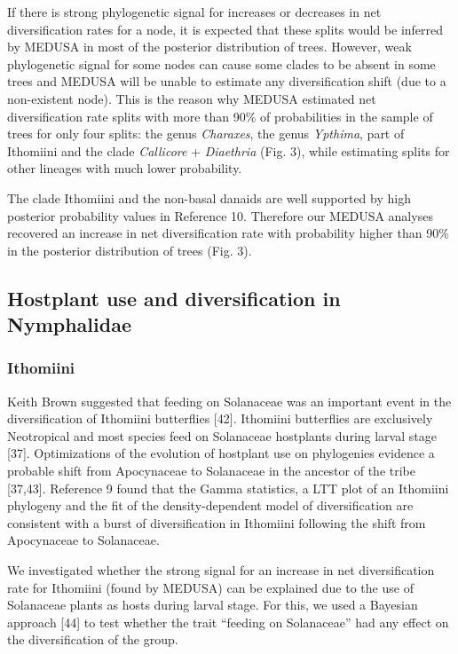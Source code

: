 \documentclass[10pt]{article}
\begin{document}
If there is strong phylogenetic signal for increases or decreases in net
diversification rates for a node, it is expected that these splits would
be inferred by MEDUSA in most of the posterior distribution of trees.
However, weak phylogenetic signal for some nodes can cause some clades
to be absent in some trees and MEDUSA will be unable to estimate any
diversification shift (due to a non-existent node). This is the reason
why MEDUSA estimated net diversification rate splits with more than 90\%
of probabilities in the sample of trees for only four splits: the genus
\emph{Charaxes}, the genus \emph{Ypthima}, part of Ithomiini and the
clade \emph{Callicore} + \emph{Diaethria} (Fig. 3), while estimating
splits for other lineages with much lower probability.

The clade Ithomiini and the non-basal danaids are well supported by high
posterior probability values in Reference 10. Therefore our MEDUSA
analyses recovered an increase in net diversification rate with
probability higher than 90\% in the posterior distribution of trees
(Fig. 3).

\subsection*{Hostplant use and diversification in Nymphalidae}

\subsubsection*{Ithomiini}

Keith Brown suggested that feeding on Solanaceae was an important event
in the diversification of Ithomiini butterflies {[}42{]}. Ithomiini
butterflies are exclusively Neotropical and most species feed on
Solanaceae hostplants during larval stage {[}37{]}. Optimizations of the
evolution of hostplant use on phylogenies evidence a probable shift from
Apocynaceae to Solanaceae in the ancestor of the tribe {[}37,43{]}.
Reference 9 found that the Gamma statistics, a LTT plot of an Ithomiini
phylogeny and the fit of the density-dependent model of diversification
are consistent with a burst of diversification in Ithomiini following
the shift from Apocynaceae to Solanaceae.

We investigated whether the strong signal for an increase in net
diversification rate for Ithomiini (found by MEDUSA) can be explained
due to the use of Solanaceae plants as hosts during larval stage. For
this, we used a Bayesian approach {[}44{]} to test whether the trait
``feeding on Solanaceae'' had any effect on the diversification of the
group.
\end{document}
